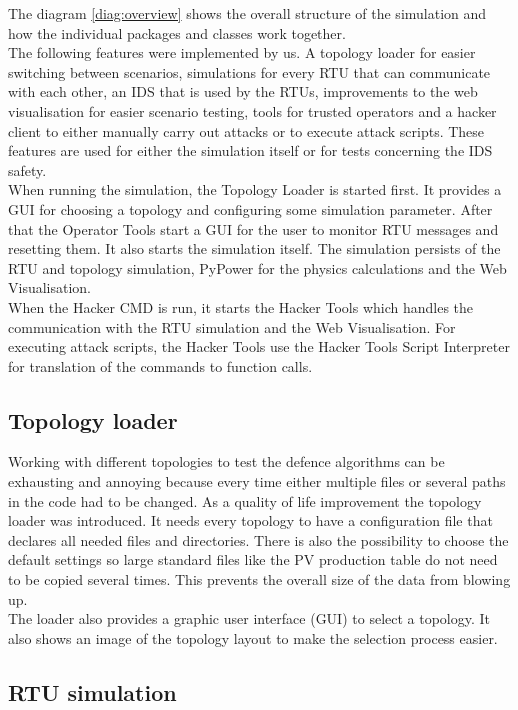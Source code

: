 \documentclass[conference]{IEEEtran}
\begin{document}
		The diagram \ref{diag:overview} shows the overall structure of the simulation and how the individual packages and classes work together. \\
		The following features were implemented by us. A topology loader for easier switching between scenarios, simulations for every RTU that can communicate with each other, an IDS that is used by the RTUs, improvements to the web visualisation for easier scenario testing, tools for trusted operators and a hacker client to either manually carry out attacks or to execute attack scripts. These features are used for either the simulation itself or for tests concerning the IDS safety.\\
		When running the simulation, the Topology Loader is started first. It provides a GUI for choosing a topology and configuring some simulation parameter. After that the Operator Tools start a GUI for the user to monitor RTU messages and resetting them. It also starts the simulation itself. The simulation persists of the RTU and topology simulation, PyPower for the physics calculations and the Web Visualisation. \\
		When the Hacker CMD is run, it starts the Hacker Tools which handles the communication with the RTU simulation and the Web Visualisation. For executing attack scripts, the Hacker Tools use the Hacker Tools Script Interpreter for translation of the commands to function calls.
	
	\subsection{Topology loader}
		
		Working with different topologies to test the defence algorithms can be exhausting and annoying because every time either multiple files or several paths in the code had to be changed. As a quality of life improvement the topology loader was introduced. It needs every topology to have a configuration file that declares all needed files and directories. There is also the possibility to choose the default settings so large standard files like the PV production table do not need to be copied several times. This prevents the overall size of the data from blowing up. \\
		The loader also provides a graphic user interface (GUI) to select a topology. It also shows an image of the topology layout to make the selection process easier.
	
	\subsection{RTU simulation}
		
\end{document}

